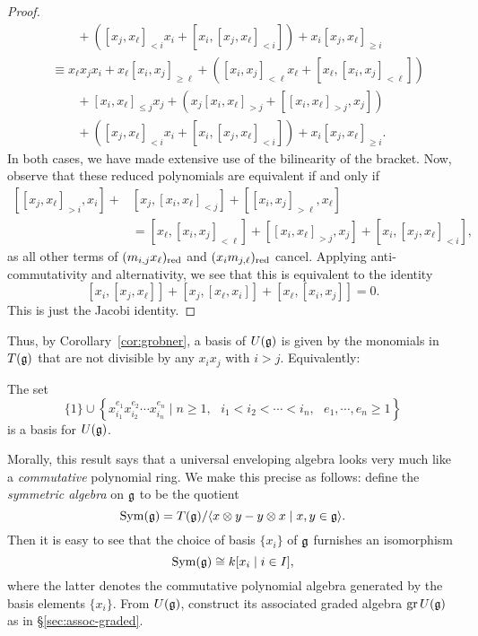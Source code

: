 \begin{proof}
\begin{align*}
&\qquad+([x_j,x_\ell]_{<i}x_i+[x_i,[x_j,x_\ell]_{<i}])+x_i[x_j,x_\ell]_{\ge i}\\
&\equiv x_\ell x_jx_i+x_\ell[x_i,x_j]_{\ge \ell}+([x_i,x_j]_{<\ell}x_\ell+[x_\ell,[x_i,x_j]_{<\ell}])\\
&\qquad+[x_i,x_\ell]_{\le j}x_j+(x_j[x_i,x_\ell]_{>j}+[[x_i,x_\ell]_{>j},x_j])\\
&\qquad+([x_j,x_\ell]_{<i}x_i+[x_i,[x_j,x_\ell]_{<i}])+x_i[x_j,x_\ell]_{\ge i}.
\end{align*}
In both cases, we have made extensive use of the bilinearity of the bracket. Now, observe that these reduced polynomials are equivalent if and only if
\begin{equation}
\label{eqn:ueaconsistency}
\begin{split}
[[x_j,x_\ell]_{>i},x_i]+&[x_j,[x_i,x_\ell]_{<j}]+[[x_i,x_j]_{>\ell},x_\ell]\\
&=[x_\ell,[x_i,x_j]_{<\ell}]+[[x_i,x_\ell]_{>j},x_j]+[x_i,[x_j,x_\ell]_{<i}],
\end{split}
\end{equation}
as all other terms of $(m_{i,j}x_\ell)_{\mathrm{red}}$ and $(x_im_{j,\ell})_{\mathrm{red}}$ cancel. Applying anti-commutativity and alternativity, we see that this is equivalent to the identity
\begin{equation}
\label{eqn:jacobi}
[x_i,[x_j,x_\ell]]+[x_j,[x_\ell,x_i]]+[x_\ell,[x_i,x_j]]=0.
\end{equation}
This is just the Jacobi identity.
\end{proof}

Thus, by Corollary~\ref{cor:grobner}, a basis of $U(\mathfrak{g})$ is given by the monomials in $T(\mathfrak{g})$ that are not divisible by any $x_ix_j$ with $i>j$. Equivalently:
\begin{thm}
\label{thm:ugbasis}
The set
\begin{equation}
\label{eqn:ugbasis}
\{1\}\cup\left\{x_{i_1}^{e_1}x_{i_2}^{e_2}\cdots x_{i_n}^{e_n}\mid n\ge 1,\text{ }i_1<i_2<\cdots<i_n,\text{ }e_1,\cdots,e_n\ge 1\right\}
\end{equation}
is a basis for $U(\mathfrak{g})$.
\end{thm}
Morally, this result says that a universal enveloping algebra looks very much like a \emph{commutative} polynomial ring. We make this precise as follows: define the \emph{symmetric algebra} on $\mathfrak{g}$ to be the quotient
\begin{equation*}
\operatorname{Sym}(\mathfrak{g})=T(\mathfrak{g})/\langle x\otimes y-y\otimes x\mid x,y\in\mathfrak{g}\rangle.
\end{equation*}
Then it is easy to see that the choice of basis $\{x_i\}$ of $\mathfrak{g}$ furnishes an isomorphism
\begin{equation}
\label{eqn:symisopoly}
\operatorname{Sym}(\mathfrak{g})\cong k[x_i\mid i\in I],
\end{equation}
where the latter denotes the commutative polynomial algebra generated by the basis elements $\{x_i\}$. From $U(\mathfrak{g})$, construct its associated graded algebra $\operatorname{gr} U(\mathfrak{g})$ as in \S\ref{sec:assoc-graded}.

